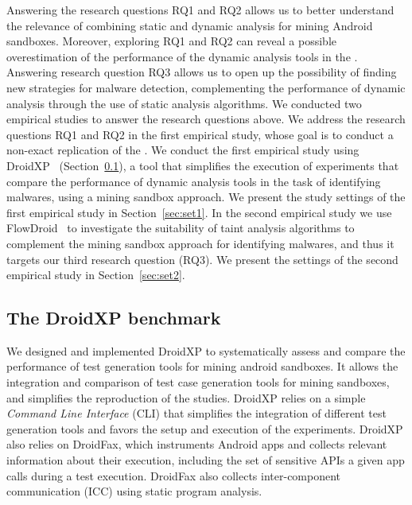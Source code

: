 
Answering the research questions RQ1 and RQ2 allows us to better
understand the relevance of combining static
and dynamic analysis for mining Android sandboxes. Moreover,
exploring RQ1 and RQ2 can reveal 
a possible overestimation of the performance of the
dynamic analysis tools in the \blls. Answering research question RQ3
allows us to open up the possibility of finding new strategies for malware detection, complementing the performance of
dynamic analysis through the use of static analysis algorithms.
We conducted two empirical studies to answer the research questions above. We address
the research questions RQ1 and RQ2 in the
first empirical study, whose goal is to conduct a non-exact replication of
the \blls. We conduct the first empirical study using
DroidXP~\cite{DBLP:conf/scam/CostaMCMVBC20} (Section~\ref{sec:droidxp}), a
tool that simplifies the execution of experiments
that compare the performance of dynamic analysis tools
in the task of identifying malwares, using a mining sandbox
approach. We present the study settings of the first
empirical study in Section~\ref{sec:set1}.
In the second empirical study we use
FlowDroid~\cite{DBLP:conf/pldi/ArztRFBBKTOM14} to investigate the 
suitability of taint analysis algorithms to complement the mining sandbox
approach for identifying malwares, and thus it targets our third
research question (RQ3). We present the settings of the second
empirical study in Section~\ref{sec:set2}. 


\subsection{The DroidXP benchmark}\label{sec:droidxp}

We designed and implemented DroidXP to systematically assess and compare the
performance of test generation tools for mining android sandboxes. It allows
the integration and comparison of test case generation tools for mining sandboxes, and simplifies
the reproduction of the studies. DroidXP relies on a
simple \emph{Command Line Interface} (CLI) that simplifies the integration
of different test generation tools and favors the setup and execution 
of the experiments. DroidXP also relies on DroidFax, which instruments
Android apps and collects relevant information about
their execution, including the set of sensitive APIs a given
app calls during a test execution. DroidFax also collects
inter-component communication (ICC) using  static
program analysis.


